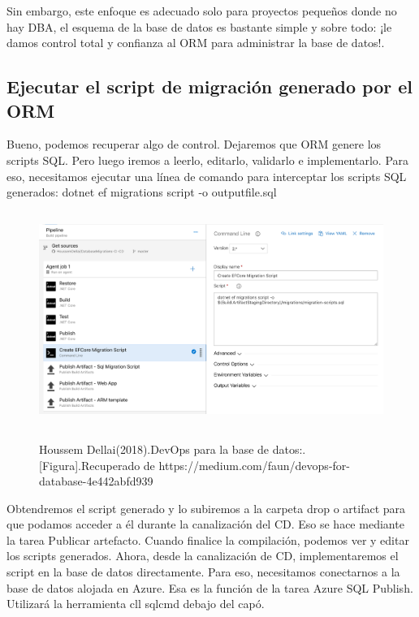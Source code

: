 \documentclass[preprint,12pt]{elsarticle}
\begin{document}
Sin embargo, este enfoque es adecuado solo para proyectos pequeños donde no hay DBA, el esquema de la base de datos es bastante simple y sobre todo: ¡le damos control total y confianza al ORM para administrar la base de datos!.

\subsection{Ejecutar el script de migración generado por el ORM}
Bueno, podemos recuperar algo de control. Dejaremos que ORM genere los scripts SQL. Pero luego iremos a leerlo, editarlo, validarlo e implementarlo.
Para eso, necesitamos ejecutar una línea de comando para interceptar los scripts SQL generados: dotnet ef migrations script -o outputfile.sql
		\begin{figure}[H]
			\begin{center}
					\includegraphics[width=12cm,height=7cm]{./IMAGENES/analisis4}
			\end{center}
			Houssem Dellai(2018).DevOps para la base de datos:.[Figura].Recuperado de 
https://medium.com/faun/devops-for-database-4e442abfd939
		\end{figure}
	Obtendremos el script generado y lo subiremos a la carpeta drop o artifact para que podamos acceder a él durante la canalización del CD. Eso se hace mediante la tarea Publicar artefacto. Cuando finalice la compilación, podemos ver y editar los scripts generados.
Ahora, desde la canalización de CD, implementaremos el script en la base de datos directamente. Para eso, necesitamos conectarnos a la base de datos alojada en Azure. Esa es la función de la tarea Azure SQL Publish. Utilizará la herramienta cll sqlcmd debajo del capó.
\end{document}
